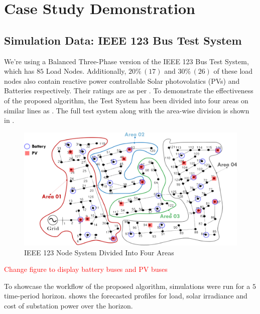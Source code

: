 \documentclass[../../outputs/main.tex]{subfiles}
\begin{document}
\section{Case Study Demonstration}

\subsection{Simulation Data: IEEE 123 Bus Test System}

We're using a Balanced Three-Phase version of the IEEE 123 Bus Test System, which has $85$ Load Nodes. Additionally, $20 \% \, (17)$ and $30 \% \, (26)$ of these load nodes also contain reactive power controllable Solar photovolatics (PVs) and Batteries respectively. Their ratings are as per . To demonstrate the effectiveness of the proposed algorithm, the Test System has been divided into four areas on similar lines as \cite{Sadnan}. The full test system along with the area-wise division is shown in .

\begin{figure}[h!]
    \centering
    \includegraphics[width=\linewidth]{../figures/ieee123-FourAreas-pv20-batt30.png}
    \caption{IEEE 123 Node System Divided Into Four Areas}
    \label{fig:ieee123-four-area-figure}
\end{figure}

\textcolor{red}{Change figure to display battery buses and PV buses}

To showcase the workflow of the proposed algorithm, simulations were run for a $5$ time-period horizon.  shows the forecasted profiles for load, solar irradiance and cost of substation power over the horizon. 
\end{document}
